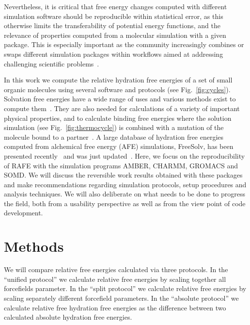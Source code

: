 \documentclass[journal=jctcce,manuscript=article]{achemso}
\begin{document}
Nevertheless, it is critical that free energy 
changes computed with different simulation software should be reproducible 
within statistical error, as this otherwise limits the transferability of 
potential energy functions, and the relevance of properties computed from a 
molecular simulation with a given package.  This is especially important as the community  
increasingly combines or swaps different simulation packages within workflows 
aimed at addressing challenging scientific 
problems~\cite{Pronk:2011:CNP:2063384.2063465, doi:10.1021/ci8000937, 
doi:10.1021/jp505332p, loeffler_fesetup:_2015, 
DBLP:journals/corr/Balasubramanian16g}.

In this work we compute the relative hydration free energies of a 
set of small organic molecules using several software and protocols (see Fig.~\ref{fig:cycles}).  Solvation free 
energies have a wide range of uses and various methods exist to compute
them~\cite{Skyner:2015:PCCP}.  They are also needed for calculations of a 
variety of important physical properties, and to calculate binding free 
energies where the solution simulation  (see Fig.~\ref{fig:thermocycle}) is 
combined with a mutation of the molecule bound to a 
partner~\cite{Skyner:2015:PCCP}.  A large database of hydration free energies 
computed from alchemical free energy (AFE) simulations, FreeSolv, has been 
presented recently~\cite{Mobley2014} and was just 
updated~\cite{doi:10.1021/acs.jced.7b00104}. Here, we focus on the 
reproducibility of RAFE with the simulation programs AMBER, CHARMM, GROMACS and 
SOMD.  We will discuss the reversible work results obtained with these packages 
and make recommendations regarding simulation protocols, setup procedures and 
analysis techniques.  We will also deliberate on what needs to be done to 
progress the field, both from a usability perspective as well as from the view 
point of code development.


\section{Methods}
\label{sec:methods}

We will compare relative free energies calculated via three protocols. In the ``unified protocol'' we calculate relative free energies by scaling together all forcefields parameter. In the  ``split protocol'' we calculate relative free energies by  scaling separately different forcefield parameters. In the ``absolute protocol'' we calculate relative free hydration free energies as the difference between two calculated absolute hydration free energies.
\end{document}
